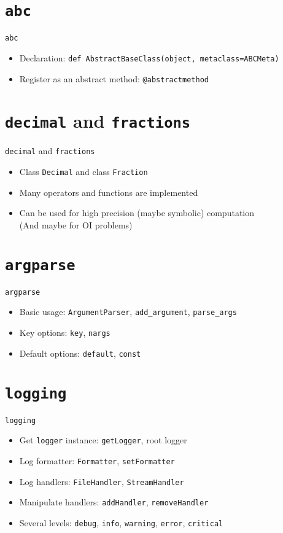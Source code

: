 \documentclass[xcolor=table]{mysld}
\begin{document}
\section{\texttt{abc}}
\begin{frame}[fragile]{\texttt{abc}}
\begin{itemize}
\item Declaration: \verb"def AbstractBaseClass(object, metaclass=ABCMeta)"
\item Register as an abstract method: \verb"@abstractmethod"
\end{itemize}
\end{frame}

\section{\texttt{decimal} and \texttt{fractions}}
\begin{frame}[fragile]{\texttt{decimal} and \texttt{fractions}}
\begin{itemize}
\item Class \verb"Decimal" and class \verb"Fraction"
\item Many operators and functions are implemented
\item Can be used for high precision (maybe symbolic) computation \\
(And maybe for OI problems)
\end{itemize}
\end{frame}

\section{\texttt{argparse}}
\begin{frame}[fragile]{\texttt{argparse}}
\begin{itemize}
\item Basic usage: \verb"ArgumentParser", \verb"add_argument", \verb"parse_args"
\item Key options: \verb"key", \verb"nargs"
\item Default options: \verb"default", \verb"const"
\end{itemize}
\end{frame}

\section{\texttt{logging}}
\begin{frame}[fragile]{\texttt{logging}}
\begin{itemize}
\item Get \verb"logger" instance: \verb"getLogger", root logger
\item Log formatter: \verb"Formatter", \verb"setFormatter"
\item Log handlers: \verb"FileHandler", \verb"StreamHandler"
\item Manipulate handlers: \verb"addHandler", \verb"removeHandler"
\item Several levels: \verb"debug", \verb"info", \verb"warning", \verb"error", \verb"critical"
\end{itemize}
\end{frame}
\end{document}
